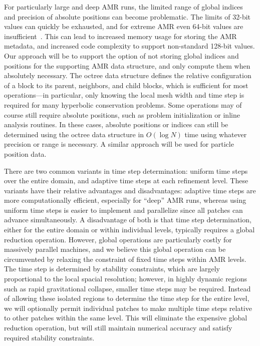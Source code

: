 \documentclass[11pt,letterpaper]{article}
\begin{document}
%
For particularly large and deep AMR runs, the limited range of global
indices and precision of absolute positions can become problematic.
The limits of 32-bit values can quickly be exhausted, and for extreme
AMR even 64-bit values are insufficient~\cite{BrAb01}.  This can lead
to increased memory usage for storing the AMR metadata, and increased
code complexity to support non-standard 128-bit values.  Our approach
will be to support the option of not storing global indices and
positions for the supporting AMR data structure, and only compute them
when absolutely necessary.  The octree data structure defines the
relative configuration of a block to its parent, neighbors, and child
blocks, which is sufficient for most operations---in particular, only
knowing the local mesh width and time step is required for many
hyperbolic conservation problems.  Some operations may of course still
require absolute positions, such as problem initialization or inline
analysis routines.  In these cases, absolute positions or indices can
still be determined using the octree data structure in $O(\log N)$
time using whatever precision or range is necessary.  A similar
approach will be used for particle position data.


%
There are two common variants in time step determination: uniform time
steps over the entire domain, and adaptive time steps at each
refinement level.  These variants have their relative advantages and
disadvantages: adaptive time steps are more computationally efficient,
especially for ``deep'' AMR runs, whereas using uniform time steps is
easier to implement and parallelize since all patches can advance
simultaneously.  A disadvantage of both is that time step
determination, either for the entire domain or within individual
levels, typically requires a global reduction operation.  However,
global operations are particularly costly for massively parallel
machines, and we believe this global operation can be circumvented by
relaxing the constraint of fixed time steps within AMR levels.  The
time step is determined by stability constraints, which are largely
proportional to the local spacial resolution; however, in highly
dynamic regions such as rapid gravitational collapse, smaller time
steps may be required.  Instead of allowing these isolated regions to
determine the time step for the entire level, we will optionally
permit individual patches to make multiple time steps relative to
other patches within the same level.  This will eliminate the
expensive global reduction operation, but will still maintain
numerical accuracy and satisfy required stability constraints.
\end{document}
